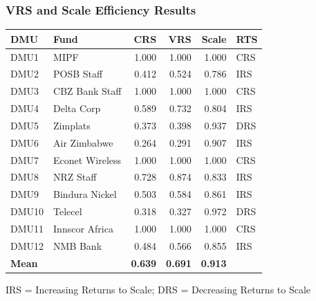 \documentclass{beamer}
\begin{document}
\begin{frame}
    \frametitle{VRS and Scale Efficiency Results}
    \begin{table}
    \centering
    \tiny
    \begin{tabular}{llrrrl}
    \hline
    \textbf{DMU} & \textbf{Fund} & \textbf{CRS} & \textbf{VRS} & \textbf{Scale} & \textbf{RTS} \\
    \hline
    DMU1  & MIPF            & 1.000 & 1.000 & 1.000 & CRS \\
    DMU2  & POSB Staff      & 0.412 & 0.524 & 0.786 & IRS \\
    DMU3  & CBZ Bank Staff  & 1.000 & 1.000 & 1.000 & CRS \\
    DMU4  & Delta Corp      & 0.589 & 0.732 & 0.804 & IRS \\
    DMU5  & Zimplats        & 0.373 & 0.398 & 0.937 & DRS \\
    DMU6  & Air Zimbabwe    & 0.264 & 0.291 & 0.907 & IRS \\
    DMU7  & Econet Wireless & 1.000 & 1.000 & 1.000 & CRS \\
    DMU8  & NRZ Staff       & 0.728 & 0.874 & 0.833 & IRS \\
    DMU9  & Bindura Nickel  & 0.503 & 0.584 & 0.861 & IRS \\
    DMU10 & Telecel         & 0.318 & 0.327 & 0.972 & DRS \\
    DMU11 & Innscor Africa  & 1.000 & 1.000 & 1.000 & CRS \\
    DMU12 & NMB Bank        & 0.484 & 0.566 & 0.855 & IRS \\
    \hline
    \textbf{Mean} & & \textbf{0.639} & \textbf{0.691} & \textbf{0.913} & \\
    \hline
    \end{tabular}
    \end{table}
    \scriptsize IRS = Increasing Returns to Scale; DRS = Decreasing Returns to Scale
\end{frame}
\end{document}
